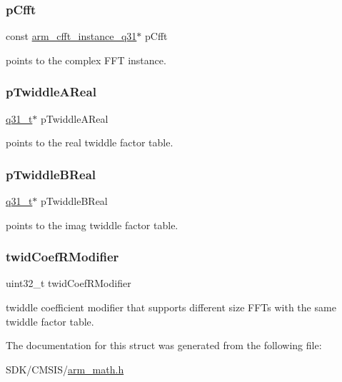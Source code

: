 \subsubsection{\texorpdfstring{p\+Cfft}{pCfft}}
{\footnotesize\ttfamily const \mbox{\hyperlink{structarm__cfft__instance__q31}{arm\+\_\+cfft\+\_\+instance\+\_\+q31}}$\ast$ p\+Cfft}

points to the complex F\+FT instance. \mbox{\label{structarm__rfft__instance__q31_a059faa282f9186687d843ead4a7a0d7e}} 
\subsubsection{\texorpdfstring{p\+Twiddle\+A\+Real}{pTwiddleAReal}}
{\footnotesize\ttfamily \mbox{\hyperlink{arm__math_8h_adc89a3547f5324b7b3b95adec3806bc0}{q31\+\_\+t}}$\ast$ p\+Twiddle\+A\+Real}

points to the real twiddle factor table. \mbox{\label{structarm__rfft__instance__q31_a611c385424ce77519f599980f96d5846}} 
\subsubsection{\texorpdfstring{p\+Twiddle\+B\+Real}{pTwiddleBReal}}
{\footnotesize\ttfamily \mbox{\hyperlink{arm__math_8h_adc89a3547f5324b7b3b95adec3806bc0}{q31\+\_\+t}}$\ast$ p\+Twiddle\+B\+Real}

points to the imag twiddle factor table. \mbox{\label{structarm__rfft__instance__q31_a5b06f7f76c018db993fe6acc5708c589}} 
\subsubsection{\texorpdfstring{twid\+Coef\+R\+Modifier}{twidCoefRModifier}}
{\footnotesize\ttfamily uint32\+\_\+t twid\+Coef\+R\+Modifier}

twiddle coefficient modifier that supports different size F\+F\+Ts with the same twiddle factor table. 

The documentation for this struct was generated from the following file\+:\begin{DoxyCompactItemize}
\item 
S\+D\+K/\+C\+M\+S\+I\+S/\mbox{\hyperlink{arm__math_8h}{arm\+\_\+math.\+h}}\end{DoxyCompactItemize}
